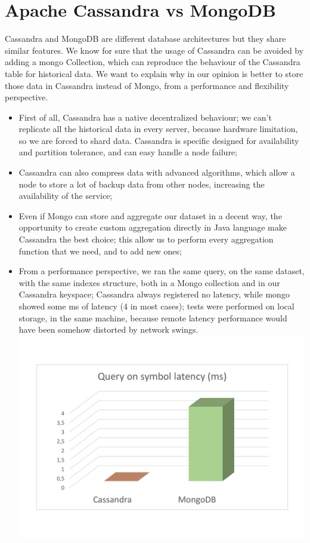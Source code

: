 \section{Apache Cassandra vs MongoDB}
Cassandra and MongoDB are different database architectures but they share similar features. 
We know for sure that the usage of Cassandra can be avoided by adding a mongo Collection,
which can reproduce the behaviour of the Cassandra table for historical data. We want to explain
why in our opinion is better to store those data in Cassandra instead of Mongo, from a
performance and flexibility perspective.
\begin{itemize}
    \item 
    First of all, Cassandra has a native decentralized behaviour; we can't replicate all
    the historical data in every server, because hardware limitation, so we are forced to 
    shard data. Cassandra is specific designed for availability and partition tolerance,
    and can easy handle a node failure;
    \item 
    Cassandra can also compress data with advanced algorithms, which allow a node to store a lot
    of backup data from other nodes, increasing the availability of the service;
    \item
    Even if Mongo can store and aggregate our dataset in a decent way, the opportunity to
    create custom aggregation directly in Java language make Cassandra the best choice; this 
    allow us to perform every aggregation function that we need, and to add new ones;
    \item
    From a performance perspective, we ran the same query, on the same dataset, with the same 
    indexes structure, both in a Mongo collection and in our Cassandra keyspace; Cassandra
    always registered no latency, while mongo showed some ms of latency (4 in most cases);
    tests were performed on local storage, in the same machine,
    because remote latency performance would have been 
    somehow distorted by network swings.\\
    \includegraphics[scale=0.16]{img/cassandra_vs_mongoDB.png}\\

\end{itemize}